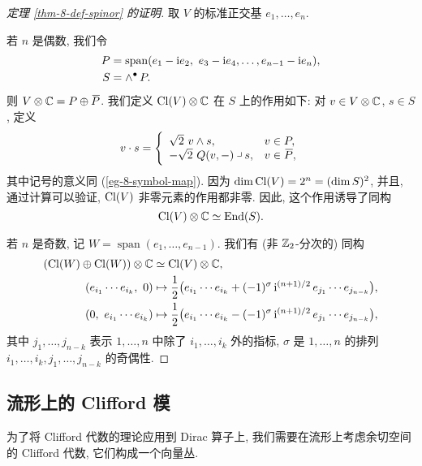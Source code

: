 \begin{proof} [定理 \ref{thm-8-def-spinor} 的证明]
    取 $V$ 的标准正交基 $e_1, \dotsc, e_n$.
    
    若 $n$ 是偶数, 我们令
    \begin{align*}
        P &= \operatorname{span}
            ( e_1 - \upi e_2, \ e_3 - \upi e_4, \dotsc, e_{n-1} - \upi e_n ), \\
        S &= \wedge^\bullet \, P.
    \end{align*}
    则 $V \otimes \bbC = P \oplus \oline2P$.
    我们定义 $\Cl (V) \otimes \bbC$ 在 $S$ 上的作用如下:
    对 $v \in V \otimes \bbC$, $s \in S$, 定义
    \[ v \cdot s = \Biggl\{ \begin{array}{ll}
        \sqrt2 \ v \wedge s, & v \in P, \\
        -\sqrt2 \ Q(v, -) \contr s, & v \in \oline2P,
    \end{array} \]
    其中记号的意义同 (\ref{eg-8-symbol-map}).
    因为 $\dim \Cl (V) = 2^n = (\dim S)^2$, 并且,
    通过计算可以验证, $\Cl (V)$ 非零元素的作用都非零.
    因此, 这个作用诱导了同构
    \[ \Cl (V) \otimes \bbC \simeq \End (S). \]
    
    若 $n$ 是奇数, 记 $W = \operatorname{span} (e_1, \dotsc, e_{n-1})$. 
    我们有 (非 $\bbZ_2$-分次的) 同构
    \begin{align*}
        ( \Cl (W) \oplus \Cl (W) ) \otimes \bbC 
            &\simeq \Cl (V) \otimes \bbC, \\
        ( e_{i_1} \cdots e_{i_k} , \ 0 )
            &\mapsto \frac12 \bigl( e_{i_1} \cdots e_{i_k}
            + (-1)^\sigma \, \upi^{(n+1)/2} \, e_{j_1} \cdots e_{j_{n-k}} \bigr), \\
        ( 0 , \ e_{i_1} \cdots e_{i_k} )
            &\mapsto \frac12 \bigl( e_{i_1} \cdots e_{i_k}
            - (-1)^\sigma \, \upi^{(n+1)/2} \, e_{j_1} \cdots e_{j_{n-k}} \bigr),
    \end{align*}
    其中 $j_1, \dotsc, j_{n-k}$ 表示 $1, \dotsc, n$ 中除了 $i_1, \dotsc, i_k$ 外的指标,
    $\sigma$ 是 $1, \dotsc, n$ 的排列 $i_1, \dotsc, i_k, j_1, \dotsc, j_{n-k}$ 的奇偶性.
\end{proof}


\subsection{流形上的 Clifford 模}

为了将 Clifford 代数的理论应用到 Dirac 算子上,
我们需要在流形上考虑余切空间的 Clifford 代数, 它们构成一个向量丛.

